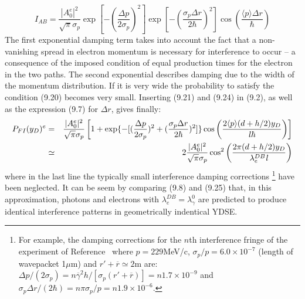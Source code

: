 {   \begin{equation} 
 I_{AB} =\frac{|A_0^e|^2}{\sqrt{\pi} \sigma_p}\exp[-(\frac{\Delta p}{2 \sigma_p})^2] \exp[-(\frac{\sigma_p \Delta r}{2 \hbar})^2]
  \cos\left(\frac{\langle p \rangle  \Delta r}{ \hbar}\right)
   \end{equation}
   The first exponential damping term takes into account the fact that a non-vanishing spread in electron
   momentum is necessary for interference to occur -- a consequence of the imposed condition of equal production
   times for the electron in the two paths. The second exponential describes damping due to the width of the
    momentum distribution. If it is very wide the probability to satisfy the condition (9.20) becomes very small.
    Inserting (9.21) and (9.24) in (9.2), as well as the expression (9.7) for $\Delta r$, gives finally:
   \begin{eqnarray}
      P_{FI}(y_D)^e & = & \frac{|A_0^e|^2}{\sqrt{\pi} \sigma_p}\left[1+ \exp\{-[(\frac{\Delta p}{2 \sigma_p} )^2+
(\frac{\sigma_p \Delta r}{2  \hbar })^2]\} \cos \left(\frac{2 \langle p \rangle (d+h/2)y_D}{{\it l} \hbar}\right)\right]
  \nonumber \\
    & \simeq & 2 \frac{|A_0^e|^2}{\sqrt{\pi} \sigma_p} \cos^2\left(\frac{2 \pi(d+h/2) y_D}{\lambda_e^{DB} {\it l}}\right)
  \end{eqnarray}
     where in the last line the typically small interference damping corrections
     \footnote{For example, the damping corrections for the $n$th interference fringe of the experiment
    of Reference~\cite{TEMK} where $ p = 229$MeV/c, $\sigma_p/p = 6.0 \times 10^{-7}$ (length of wavepacket 1$\mu$m) and
    $r'+\overline{r} \simeq 2$m are: $\Delta p/(2 \sigma_p) = n \overline{\gamma}^2 h/[\sigma_p(r'+\overline{r})] =
     n 1.7 \times 10^{-9}$ and $\sigma_p \Delta r/(2 \hbar) = n \pi \sigma_p/p = n 1.9 \times 10^{-6}$.} have been neglected.
   It can be seem by comparing (9.8) and (9.25) that, in this approximation, photons and electrons with
    $\lambda_e^{DB} = \lambda_{\gamma}^0$ are predicted
    to  produce identical interference patterns in geometrically indentical YDSE.

}
